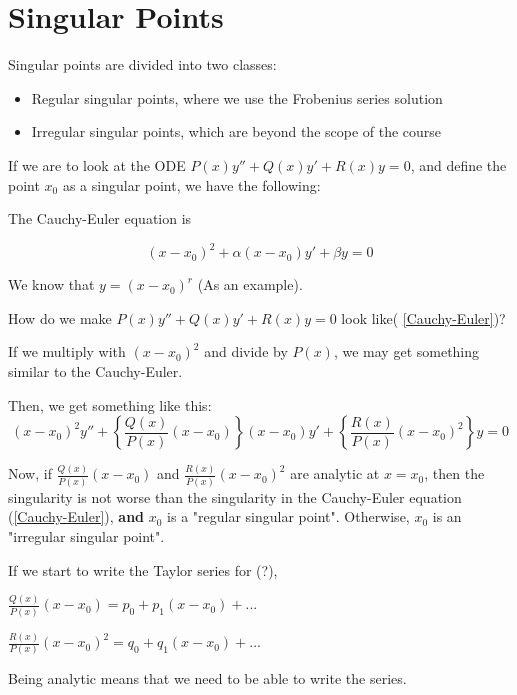 \graphicspath{{./Lecture3/}}
\section{Singular Points}

Singular points are divided into two classes:

\begin{itemize}
    \item Regular singular points, where we use the Frobenius series solution
    \item Irregular singular points, which are beyond the scope of the course
\end{itemize}

If we are to look at the ODE $P(x) y'' + Q(x) y' + R(x) y = 0$, and define the point $x_0$ as a singular point, we have the following:

The Cauchy-Euler equation is 

\begin{equation}
\label{Cauchy-Euler}
    (x - x_0)^2 + \alpha (x - x_0) y' + \beta y = 0
\end{equation}

We know that $y = (x - x_0)^r$ (As an example). 

How do we make $P(x) y'' + Q(x) y' + R(x) y = 0$ look like( \ref{Cauchy-Euler})?

If we multiply with $(x - x_0)^2$ and divide by $P(x)$, we may get something similar to the Cauchy-Euler. 

Then, we get something like this:
\begin{equation}
    (x - x_0)^2 y'' + \left\{ \frac{Q(x)}{P(x)} (x - x_0) \right\} (x - x_0) y' + \left\{ \frac{R(x)}{P(x)} (x - x_0)^2 \right\} y = 0
\end{equation}


Now, if $\frac{Q(x)}{P(x)}(x - x_0)$ and $\frac{R(x)}{P(x)} (x - x_0)^2$ are analytic at $x = x_0$, then the singularity is not worse than the singularity in the Cauchy-Euler equation (\ref{Cauchy-Euler}), \textbf{and} $x_0$ is a "regular singular point". Otherwise, $x_0$ is an "irregular singular point". 

If we start to write the Taylor series for (?),

$\frac{Q(x)}{P(x)} (x - x_0) = p_0 + p_1 (x - x_0) + ...$

$\frac{R(x)}{P(x)} (x - x_0)^2 = q_0 + q_1 (x - x_0) + ...$

Being analytic means that we need to be able to write the series. 

